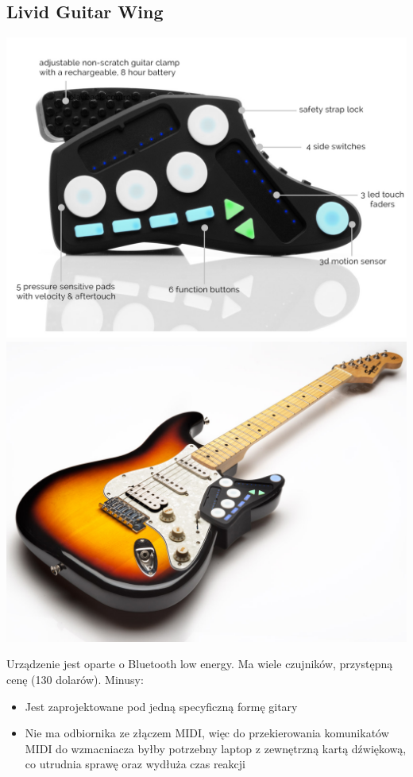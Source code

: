 \documentclass[eng,printmode]{mgr}
\begin{document}
\subsection{Livid Guitar Wing}
\includegraphics[width=\textwidth]{livid1}
\includegraphics[width=\textwidth]{livid2}

Urządzenie jest oparte o Bluetooth low energy. Ma wiele czujników, przystępną cenę (130 dolarów).
Minusy:

\begin{itemize}
\item Jest zaprojektowane pod jedną specyficzną formę gitary
\item Nie ma odbiornika ze złączem MIDI, więc do przekierowania komunikatów MIDI do wzmacniacza byłby potrzebny laptop z zewnętrzną kartą dźwiękową, co utrudnia sprawę oraz wydłuża czas reakcji
\end{itemize}
\end{document}
